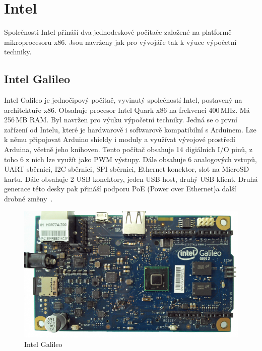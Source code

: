 \section{Intel}
\label{KapIntel}

Společnosti Intel přináší dva jednodeskové počítače založené na platformě mikroprocesoru x86. Jsou navrženy jak pro vývojáře tak k výuce výpočetní techniky.

		\subsection{Intel Galileo}
		Intel Galileo je jednočipový počítač, vyvinutý společností Intel, postavený na architektuře x86. Obsahuje procesor Intel Quark x86 na frekvenci 400\,MHz. Má 256\,MB RAM. Byl navržen pro výuku výpočetní techniky. Jedná se o první zařízení od Intelu, které je hardwarově i softwarově kompatibilní s Arduinem. Lze k němu připojovat Arduino shieldy i moduly a využívat vývojové prostředí Arduina, včetně jeho knihoven. 
		Tento počítač obsahuje 14 digiálních I/O pinů, z toho 6 z nich lze využít jako PWM výstupy. Dále obsahuje 6 analogových vstupů, UART sběrnici, I2C sběrnici, SPI sběrnici, Ethernet konektor, slot na MicroSD kartu. Dále obsahuje 2 USB konektory, jeden USB-host, druhý USB-klient. Druhá generace této desky pak přináší podporu PoE (Power over Ethernet)a další drobné změny~\cite{IntelGalileo,ArduinoGalileo}.
\begin{figure}[!ht]
  \begin{center}
    \includegraphics[scale=0.45]{obrazky/embed_intel_galileo}
  \end{center}
	\vspace{-20pt}
  \caption{Intel Galileo~\cite{IntelGalileo}}
	\vspace{-10pt}
\end{figure}
		
